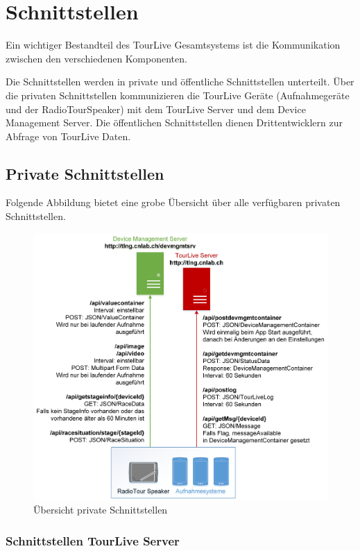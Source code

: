 \chapter{Schnittstellen}

Ein wichtiger Bestandteil des TourLive Gesamtsystems ist die Kommunikation zwischen den verschiedenen Komponenten. 

Die Schnittstellen werden in private und öffentliche Schnittstellen unterteilt. Über die privaten Schnittstellen kommunizieren die TourLive Geräte (Aufnahmegeräte und der RadioTourSpeaker) mit dem TourLive Server und dem Device Management Server. Die öffentlichen Schnittstellen dienen Drittentwicklern zur Abfrage von TourLive Daten. 

\section{Private Schnittstellen}
Folgende Abbildung bietet eine grobe Übersicht über alle verfügbaren privaten Schnittstellen.
\begin{figure}[H]
	\centering
	\includegraphics[width=130mm]{images/uebersicht_schnittstelle.png}
	\caption{Übersicht private Schnittstellen}
\end{figure}

\subsection{Schnittstellen TourLive Server}
\label{sec:tourliveserverapi}

